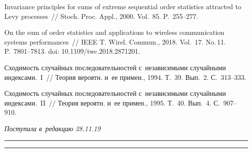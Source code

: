 \begin{multicols}{2}
{{\begin{thebibliography}{99}
 Invariance principles for sums of extreme sequential 
order statistics attracted to Levy processes~// Stoch. Proc. Appl., 2000. 
Vol.~85. P.~255--277.

On the sum of order statistics and applications to wireless communication
systems performances~// 
IEEE T. Wirel. Commun., 2018. Vol.~17. No.\,11. P.~7801--7813. doi: 10.1109/twc.2018.2871201.

Сходимость случайных последовательностей с~независимыми случайными индексами.~I~// 
Теория вероятн. и~ее примен., 1994. Т.~39. Вып.~2. С.~313--333. 

Сходимость случайных последовательностей с~независимыми случайными индексами.~II~// 
Теория вероятн. и~ее примен., 1995. Т.~40. Вып.~4. С.~907--910. 

\end{thebibliography}

 }
 }

\end{multicols}




\vspace*{-6pt}

\hfill{\small\textit{Поступила в~редакцию 28.11.19}}

\vspace*{8pt}




\hrule

\vspace*{2pt}

\hrule


\def\tit{ON THE DISTRIBUTION OF~THE~RATIO OF~THE~SUM OF~SAMPLE ELEMENTS EXCEEDING 
A~THRESHOLD TO~THE~TOTAL SUM OF~SAMPLE ELEMENTS.~I}


\def\titkol{On the distribution of~the~ratio of~the~sum of~sample elements exceeding 
a~threshold to~the~total sum of~sample elements.~I}

\def\aut{V.\,Yu.~Korolev$^{1,2}$}

\def\autkol{V.\,Yu.~Korolev}

